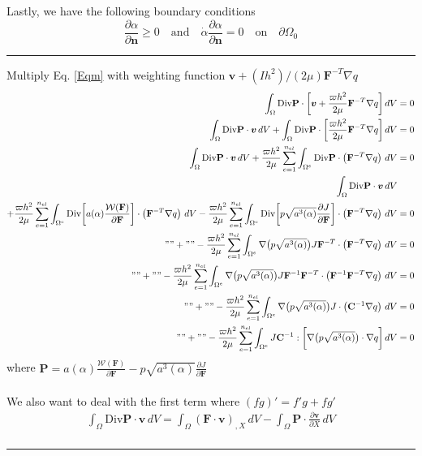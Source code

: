 \documentclass[12pt,3p]{article}
\numberwithin{equation}{section}
\begin{document}
Lastly, we have the following boundary conditions 
\begin{equation}
\frac{\partial \alpha}{\partial \mathbf{n}} \geq 0 \quad \text{and} \quad \dot{\alpha} \frac{\partial \alpha}{\partial \mathbf{n}} = 0 \quad \text{on} \quad \partial \Omega_0
\end{equation}
\noindent\rule{\linewidth}{0.5pt} %
Multiply Eq. \ref{Eqm} with weighting function $\bm{v}+(I h^2)/(2\mu)\mathbf{F}^{-T}\nabla q$
\begin{align*}
\int_{\Omega} \text{Div} \mathbf{P} \cdot \bigg[ \bm{v} + \frac{\varpi h^2}{2\mu} \mathbf{F}^{-T}\nabla q \bigg] \, dV &= 0 \\
\int_{\Omega} \text{Div} \mathbf{P} \cdot \bm{v} \, dV + \int_{\Omega} \text{Div} \mathbf{P} \cdot \bigg[ \frac{\varpi h^2}{2\mu} \mathbf{F}^{-T}\nabla q \bigg] \, dV &= 0 \\
\int_{\Omega} \text{Div} \mathbf{P} \cdot \bm{v} \, dV + \frac{\varpi h^2}{2\mu} \sum_{e=1}^{n_{el}}\int_{\Omega^{e}} \text{Div} \mathbf{P} \cdot \left(\mathbf{F}^{-T}\nabla q\right) \,dV &= 0 \\
\int_{\Omega} \text{Div} \mathbf{P} \cdot \bm{v} \, dV &\\
+ \frac{\varpi h^2}{2\mu} \sum_{e=1}^{n_{el}}\int_{\Omega^{e}} \text{Div} \bigg[ a(\alpha) \frac{\mathcal{W}(\mathbf{F})}{\partial \mathbf{F}} \bigg] \cdot \left(\mathbf{F}^{-T} \nabla q \right) \,dV - \frac{\varpi h^2}{2\mu} \sum_{e=1}^{n_{el}}\int_{\Omega^{e}} \text{Div} \bigg[ p \sqrt{a^3(\alpha)} \frac{\partial J}{\partial \mathbf{F}} \bigg] \cdot \left(\mathbf{F}^{-T} \nabla q \right) \,dV &= 0 \\
"" + "" - \frac{\varpi h^2}{2\mu} \sum_{e=1}^{n_{el}}\int_{\Omega^{e}} \nabla \big( p \sqrt{a^3(\alpha)} \big) J \mathbf{F}^{-T} \cdot \left(\mathbf{F}^{-T}\nabla q \right) \,dV &= 0 \\
"" + "" - \frac{\varpi h^2}{2\mu} \sum_{e=1}^{n_{el}}\int_{\Omega^{e}} \nabla \big( p \sqrt{a^3(\alpha)} \big) J \mathbf{F}^{-1} \mathbf{F}^{-T} \cdot \left( \mathbf{F}^{-1} \mathbf{F}^{-T}\nabla q \right) \,dV &= 0 \\
"" + "" - \frac{\varpi h^2}{2\mu} \sum_{e=1}^{n_{el}}\int_{\Omega^{e}} \nabla \big( p \sqrt{a^3(\alpha)} \big) J \cdot \left( \mathbf{C}^{-1} \nabla q \right) \,dV &= 0 \\
"" + "" - \frac{\varpi h^2}{2\mu} \sum_{e=1}^{n_{el}}\int_{\Omega^{e}} J \mathbf{C}^{-1} : \bigg[ \nabla \big( p \sqrt{a^3(\alpha)} \big) \cdot \nabla q \bigg] \,dV &= 0 
\end{align*}
where $\mathbf{P} = a(\alpha) \frac{\mathcal{W}(\mathbf{F})}{\partial \mathbf{F}} - p \sqrt{a^3(\alpha)} \frac{\partial J}{\partial \mathbf{F}}$ \\ \\
We also want to deal with the first term where $(fg)' = f' g + f g'$
\begin{align*}
\int_{\Omega} \text{Div} \mathbf{P} \cdot \bm{v} \, dV = \int_{\Omega} (\mathbf{F} \cdot \bm{v})_{,X} \, dV - \int_{\Omega} \mathbf{P} \cdot \frac{\partial \bm{v}}{\partial X} \, dV \\
\end{align*}
\noindent\rule{\linewidth}{0.5pt} %
\end{document}
